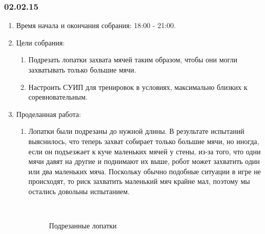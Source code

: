 \subsubsection{02.02.15}
\begin{enumerate}
	
	\item Время начала и окончания собрания: 18:00 - 21:00.
	
	\item Цели собрания: 
	\begin{enumerate}
		
		\item Подрезать лопатки захвата мячей таким образом, чтобы они могли захватывать только большие мячи.
		
		\item Настроить СУИП для тренировок в условиях, максимально близких к соревновательным.
		
	\end{enumerate}

	\item Проделанная работа:
	\begin{enumerate}
		
		\item Лопатки были подрезаны до нужной длины. В результате испытаний выяснилось, что теперь захват собирает только большие мячи, но иногда, если он подъезжает к куче маленьких мячей у стены, из-за того, что одни мячи давят на другие и поднимают их выше, робот может захватить один или два маленьких мяча. Поскольку обычно подобные ситуации в игре не происходят, то риск захватить маленький мяч крайне мал, поэтому мы остались довольны испытанием.
		\begin{figure}[H]
			\begin{minipage}[h]{0.2\linewidth}
				\center  
			\end{minipage}
			\begin{minipage}[h]{0.6\linewidth}
				\caption{Подрезанные лопатки}
			\end{minipage}
		\end{figure}
		

\end{enumerate}
\end{enumerate}
